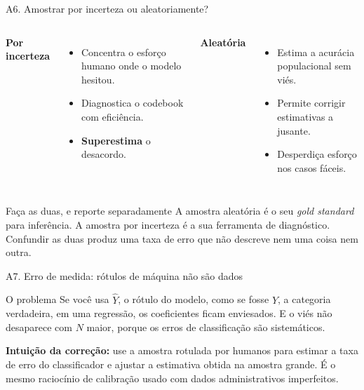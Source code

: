\documentclass[11pt,aspectratio=169]{beamer}
\begin{document}
\begin{frame}{A6. Amostrar por incerteza ou aleatoriamente?}
\begin{columns}[T]
\textbf{Por incerteza}
\begin{itemize}\small
  \item Concentra o esforço humano onde o modelo hesitou.
  \item Diagnostica o codebook com eficiência.
  \item \textbf{Superestima} o desacordo.
\end{itemize}
\textbf{Aleatória}
\begin{itemize}\small
  \item Estima a acurácia populacional sem viés.
  \item Permite corrigir estimativas a jusante.
  \item Desperdiça esforço nos casos fáceis.
\end{itemize}
\end{columns}
\vspace{0.35cm}
\begin{block}{Faça as duas, e reporte separadamente}
\small
A amostra aleatória é o seu \emph{gold standard} para inferência. A amostra por
incerteza é a sua ferramenta de diagnóstico. Confundir as duas produz uma taxa
de erro que não descreve nem uma coisa nem outra.
\end{block}
\end{frame}

\begin{frame}{A7. Erro de medida: rótulos de máquina não são dados}
\begin{block}{O problema}
Se você usa $\hat{Y}$, o rótulo do modelo, como se fosse $Y$, a categoria
verdadeira, em uma regressão, os coeficientes ficam enviesados. E o viés não
desaparece com $N$ maior, porque os erros de classificação são sistemáticos.
\end{block}
\vspace{0.3cm}
\centering
{}
\vspace{0.3cm}

\small \textbf{Intuição da correção:} use a amostra rotulada por humanos para
estimar a taxa de erro do classificador e ajustar a estimativa obtida na amostra
grande. É o mesmo raciocínio de calibração usado com dados administrativos
imperfeitos.
\end{frame}
\end{document}
